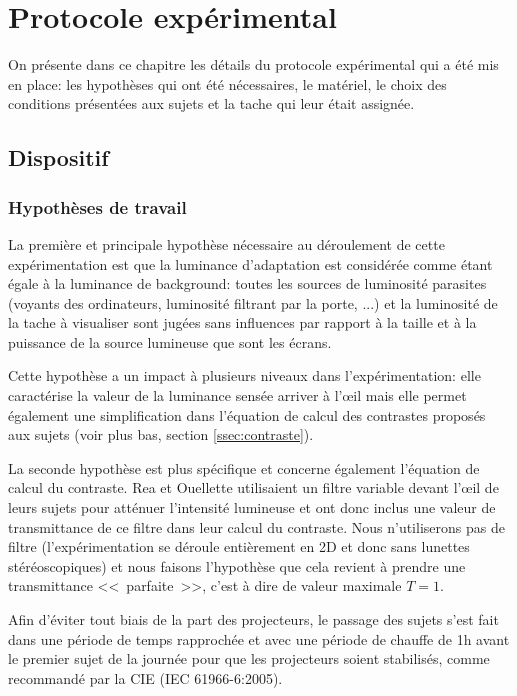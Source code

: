 \chapter{Protocole expérimental}
\par On présente dans ce chapitre les détails du protocole expérimental qui a été mis en place: les hypothèses qui ont été nécessaires, le matériel, le choix des conditions présentées aux sujets et la tache qui leur était assignée.
	
	\section{Dispositif}
	\subsection{Hypothèses de travail}
	\label{ssec:hyp_travail}
	\par La première et principale hypothèse nécessaire au déroulement de cette expérimentation est que la luminance d'adaptation est considérée comme étant égale à la luminance de background: toutes les sources de luminosité parasites (voyants des ordinateurs, luminosité filtrant par la porte, ...) et la luminosité de la tache à visualiser sont jugées sans influences par rapport à la taille et à la puissance de la source lumineuse que sont les écrans.
	
	\par Cette hypothèse a un impact à plusieurs niveaux dans l'expérimentation: elle caractérise la valeur de la luminance sensée arriver à l'œil mais elle permet également une simplification dans l'équation de calcul des contrastes proposés aux sujets (voir plus bas, section \ref{ssec:contraste}).
	
	\par La seconde hypothèse est plus spécifique et concerne également l'équation de calcul du contraste. Rea et Ouellette utilisaient un filtre variable devant l'œil de leurs sujets pour atténuer l'intensité lumineuse et ont donc inclus une valeur de transmittance de ce filtre dans leur calcul du contraste. Nous n'utiliserons pas de filtre (l'expérimentation se déroule entièrement en 2D et donc sans lunettes stéréoscopiques) et nous faisons l'hypothèse que cela revient à prendre une transmittance <<~parfaite~>>, c'est à dire de valeur maximale $T = 1$.
	
	\par Afin d'éviter tout biais de la part des projecteurs, le passage des sujets s'est fait dans une période de temps rapprochée et avec une période de chauffe de 1h avant le premier sujet de la journée pour que les projecteurs soient stabilisés, comme recommandé par la CIE (IEC 61966-6:2005).
	
